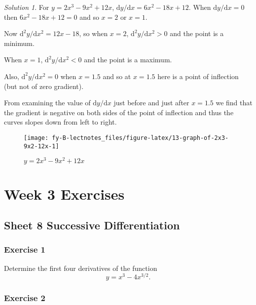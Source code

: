 \documentclass[
  11pt,
  oneside]{book}
\newcommand{\slide}{}
\theoremstyle{definition}
\theoremstyle{definition}
\theoremstyle{definition}
\theoremstyle{definition}
\theoremstyle{remark}
\newtheorem*{solution}{Solution}
\begin{document}
\begin{solution}

For \(y = 2x^3-9x^2+12x\), \(\mathrm{d}y/\mathrm{d} x = 6x^2-18x+12\). When \(\mathrm{d}y/\mathrm{d} x=0\) then \(6x^2-18x+12=0\) and so \(x=2\) or \(x=1\).

Now \(\mathrm{d}^{2}y/\mathrm{d} x^2 = 12x-18\), so when \(x=2\), \(\mathrm{d}^{2}y/\mathrm{d} x^2>0\) and the point is a minimum.

When \(x=1\), \(\mathrm{d}^{2}y/\mathrm{d} x^2<0\) and the point is a maximum.

Also, \(\mathrm{d}^{2}y/\mathrm{d} x^2=0\) when \(x=1.5\) and so at \(x=1.5\) here is a point of inflection (but not of zero gradient).

From examining the value of \(\mathrm{d}y/\mathrm{d} x\) just before and just after \(x=1.5\) we find that the gradient is negative on both sides of the point of inflection and thus the curves slopes down from left to right.

\begin{figure}

{\centering \texttt{[image: fy-B-lectnotes\_files/figure-latex/13-graph-of-2x3-9x2-12x-1]} 

}

\caption{$y = 2x^3-9x^2+12x$}\label{fig:13-graph-of-2x3-9x2-12x}
\end{figure}

\end{solution}

\chapter*{Week 3 Exercises}\label{week-3-exercises}

\section{Sheet 8 Successive Differentiation}\label{sheet-8-successive-differentiation}

\subsection*{Exercise 1}\label{exercise-1-2}

Determine the first four derivatives of the function
\[
y=x^3-4x^{3/2}.
\]
\slide

\subsection*{Exercise 2}\label{exercise-2-2}
\end{document}
